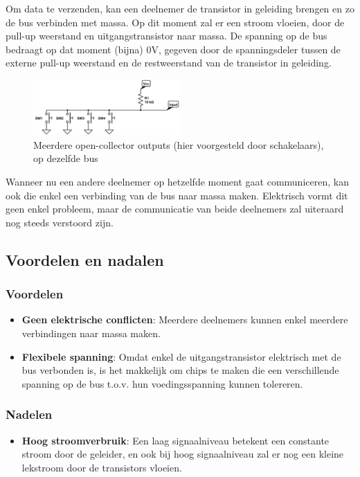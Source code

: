 \documentclass{article}
\newcommand{\bold}[1]{\textbf{#1}}
\begin{document}
Om data te verzenden, kan een deelnemer de transistor in geleiding brengen en zo de bus verbinden met
massa. Op dit moment zal er een stroom vloeien, door de pull-up weerstand en uitgangstransistor naar massa. 
De spanning op de bus bedraagt op dat moment (bijna) 0V, gegeven door de spanningsdeler tussen de 
externe pull-up weerstand en de restweerstand van de transistor in geleiding.

\begin{figure}[H]
    \centering
    \includegraphics[width=0.5\textwidth]{Screenshot_20200619_152619.png}
    \caption{Meerdere open-collector outputs (hier voorgesteld door schakelaars), op dezelfde bus}
\end{figure}

Wanneer nu een andere deelnemer op hetzelfde moment gaat communiceren, kan ook die enkel een
verbinding van de bus naar massa maken. Elektrisch vormt dit geen enkel probleem, maar de communicatie
van beide deelnemers zal uiteraard nog steeds verstoord zijn.


\subsection{Voordelen en nadalen}
\subsubsection{Voordelen}
\begin{itemize}
    \item \bold{Geen elektrische conflicten}: Meerdere deelnemers kunnen enkel meerdere verbindingen naar massa maken.
    \item \bold{Flexibele spanning}: Omdat enkel de uitgangstransistor elektrisch met de bus verbonden is, is het
    makkelijk om chips te maken die een verschillende spanning op de bus t.o.v. hun voedingsspanning
    kunnen tolereren.
\end{itemize}

\subsubsection{Nadelen}
\begin{itemize}
    \item \bold{Hoog stroomverbruik}: Een laag signaalniveau betekent een constante stroom door de geleider, en ook
    bij hoog signaalniveau zal er nog een kleine lekstroom door de transistors vloeien.
\end{itemize}
\end{document}
